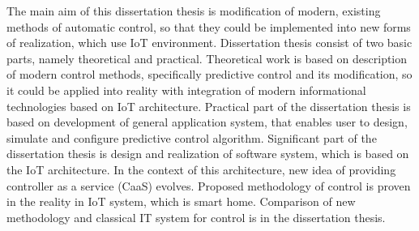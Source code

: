 The main aim of this dissertation thesis is modification of modern, existing methods of automatic control, so that they could be implemented into new forms of realization, which use IoT environment. Dissertation thesis consist of two basic parts, namely theoretical and practical. Theoretical work is based on description of modern control methods, specifically predictive control and its modification, so it could be applied into reality with integration of modern informational technologies based on IoT architecture. Practical part of the dissertation thesis is based on development of general application system, that enables user to design, simulate and configure predictive control algorithm. Significant part of the dissertation thesis is design and realization of software system, which is based on the IoT architecture. In the context of this architecture, new idea of providing controller as a service (CaaS) evolves. Proposed methodology of control is proven in the reality in IoT system, which is smart home. Comparison of new methodology and classical IT system for control is in the dissertation thesis.